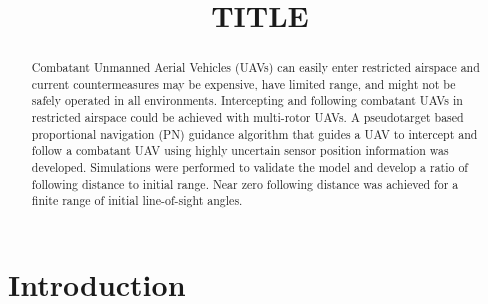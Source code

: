 \documentclass[conference]{IEEEtran}
\begin{document}
\title{TITLE}

\author{
\and
{}
}

\maketitle


\begin{abstract}
	Combatant Unmanned Aerial Vehicles (UAVs) can easily enter restricted airspace and current countermeasures may be expensive, have limited range, and might not be safely operated in all environments. Intercepting and following combatant UAVs in restricted airspace could be achieved with multi-rotor UAVs. A pseudotarget based proportional navigation (PN) guidance algorithm that guides a UAV to intercept and follow a combatant UAV using highly uncertain sensor position information was developed. Simulations were performed to validate the model and develop a ratio of following distance to initial range. Near zero following distance was achieved for a finite range of initial line-of-sight angles.
\end{abstract}

\begin{IEEEkeywords}

\end{IEEEkeywords}

\section{Introduction}
\end{document}
